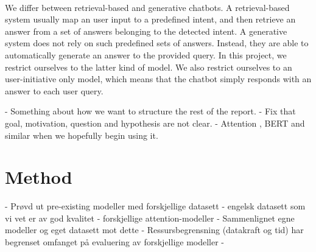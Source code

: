 \documentclass{article}
\begin{document}
\paragraph{}
We differ between retrieval-based and generative chatbots. A retrieval-based
system usually map an user input to a predefined intent, and then retrieve an
answer from a set of answers belonging to the detected intent. A generative
system does not rely on such predefined sets of answers.  Instead, they are
able to automatically generate an answer to the provided query. In this
project, we restrict ourselves to the latter kind of model. We also restrict
ourselves to an user-initiative only model, which means that the chatbot simply
responds with an answer to each user query.

\if
- Something about how we want to structure the rest of the report.  
- Fix that goal, motivation, question and hypothesis are not clear.  
- Attention \cite{Bahdanau2015}, BERT and similar when we hopefully begin using it.
\fi

\section{Method}




\if
 - Prøvd ut pre-existing modeller med forskjellige datasett
    - engelsk datasett som vi vet er av god kvalitet
    - forskjellige attention-modeller
 - Sammenlignet egne modeller og eget datasett mot dette
 - Ressursbegrensning (datakraft og tid) har begrenset omfanget på evaluering
 av forskjellige modeller
 - 

\fi
\end{document}
